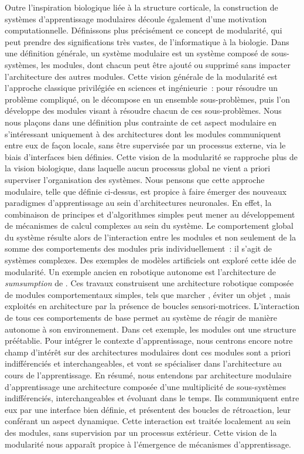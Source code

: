 Outre l'inspiration biologique liée à la structure corticale, la construction de systèmes d'apprentissage modulaires découle également d'une motivation computationnelle.
Définissons plus précisément ce concept de modularité, qui peut prendre des significations très vastes, de l'informatique à la biologie. 
Dans une définition générale, un système modulaire est un système composé de sous-systèmes, les modules, dont chacun peut être ajouté ou supprimé sans impacter l'architecture des autres modules.
Cette vision générale de la modularité est l'approche classique privilégiée en sciences et ingénieurie~: pour résoudre un problème compliqué, on le décompose en un ensemble sous-problèmes, puis l'on développe des modules visant à résoudre chacun de ces sous-problèmes.
Nous nous plaçons dans une définition plus contrainte de cet aspect modulaire en s'intéressant uniquement à des architectures dont les modules communiquent entre eux de façon locale, sans être supervisée par un processus externe, via le biais d'interfaces bien définies.
Cette vision de la modularité se rapproche plus de la vision biologique, dans laquelle aucun processus global ne vient a priori superviser l'organisation des systèmes. Nous pensons que cette approche modulaire, telle que définie ci-dessus, est propice à faire émerger des nouveaux paradigmes d'apprentissage au sein d'architectures neuronales. 
En effet, la combinaison de principes et d'algorithmes simples peut mener au développement de mécanismes de calcul complexes au sein du système. Le comportement global du système résulte alors de l'interaction entre les modules et non seulement de la somme des comportements des modules pris individuellement~: il s'agit de systèmes complexes. 
Des exemples de modèles artificiels ont exploré cette idée de modularité. Un exemple ancien en robotique autonome est l'architecture de \emph{sumsumption} de \cite{brooks_sumsumption_85}. Ces travaux construisent une architecture robotique composée de modules comportementaux simples, tels que \og marcher \fg{}, \og éviter un objet \fg{}, mais exploités en architecture par la présence de boucles sensori-motrices. L'interaction de tous ces comportements de base permet au système de réagir de manière autonome à son environnement. 
Dans cet exemple, les modules ont une structure préétablie.
Pour intégrer le contexte d'apprentissage, nous centrons encore notre champ d'intérêt sur des architectures modulaires dont ces modules sont a priori indifférenciés et interchangeables, et vont se spécialiser dans l'architecture au cours de l'apprentissage. 
En résumé, nous entendons par architecture modulaire d'apprentissage une architecture composée d'une multiplicité de sous-systèmes indifférenciés, interchangeables et évoluant dans le temps.
Ils communiquent entre eux par une interface bien définie, et présentent des boucles de rétroaction, leur conférant un aspect dynamique. Cette interaction est traitée localement au sein des modules, sans supervision par un processus extérieur.
Cette vision de la modularité nous apparaît propice à l'émergence de mécanismes d'apprentissage.


